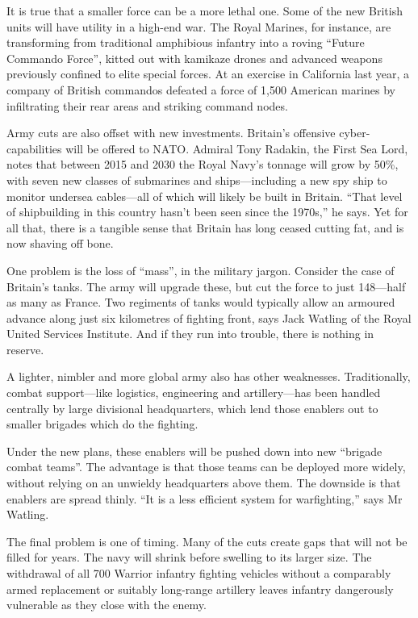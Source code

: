 \documentclass{article}
\begin{document}
It is true that a smaller force can be a more lethal one. Some of the new British units will have utility in a high-end war. The Royal Marines, for instance, are transforming from traditional amphibious infantry into a roving ``Future Commando Force'', kitted out with kamikaze drones and advanced weapons previously confined to elite special forces. At an exercise in California last year, a company of British commandos defeated a force of 1,500 American marines by infiltrating their rear areas and striking command nodes. 

Army cuts are also offset with new investments. Britain's offensive cyber-capabilities will be offered to NATO. Admiral Tony Radakin, the First Sea Lord, notes that between 2015 and 2030 the Royal Navy's tonnage will grow by 50\%, with seven new classes of submarines and ships---including a new spy ship to monitor undersea cables---all of which will likely be built in Britain. ``That level of shipbuilding in this country hasn't been seen since the 1970s,'' he says. Yet for all that, there is a tangible sense that Britain has long ceased cutting fat, and is now shaving off bone. 

One problem is the loss of ``mass'', in the military jargon. Consider the case of Britain's tanks. The army will upgrade these, but cut the force to just 148---half as many as France. Two regiments of tanks would typically allow an armoured advance along just six kilometres of fighting front, says Jack Watling of the Royal United Services Institute. And if they run into trouble, there is nothing in reserve. 

A lighter, nimbler and more global army also has other weaknesses. Traditionally, combat support---like logistics, engineering and artillery---has been handled centrally by large divisional headquarters, which lend those enablers out to smaller brigades which do the fighting. 

Under the new plans, these enablers will be pushed down into new ``brigade combat teams''. The advantage is that those teams can be deployed more widely, without relying on an unwieldy headquarters above them. The downside is that enablers are spread thinly. ``It is a less efficient system for warfighting,'' says Mr Watling. 

The final problem is one of timing. Many of the cuts create gaps that will not be filled for years. The navy will shrink before swelling to its larger size. The withdrawal of all 700 Warrior infantry fighting vehicles without a comparably armed replacement or suitably long-range artillery leaves infantry dangerously vulnerable as they close with the enemy. 
\end{document}
